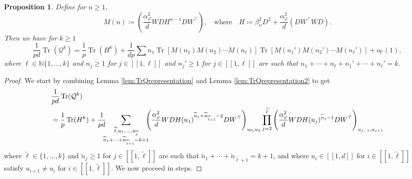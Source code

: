 \documentclass[letterpaper, 10pt, dvipsnames]{article}
\numberwithin{equation}{section}
\DeclareMathOperator{\Tr}{Tr}
\newcommand{\N}{\mathbb{N}}
\newcommand{\Q}{\mathcal{Q}}
\renewcommand{\phi}{\varphi}
\renewcommand{\tilde}{\widetilde}
\renewcommand{\P}{\mathds{P}}
\newcommand{\unn}[2]{[\![#1,#2]\!]}
\newtheorem{prop}[ccounter]{Proposition}
\theoremstyle{definition}
\begin{document}
\begin{prop}\label{prop:TrQk}
  Define for $n \geq 1$,
  \[
  M(n) \coloneqq \left(
    \frac{\alpha_\phi^2}{d} W D H^{n-1} DW^\top
  \right),
  \quad \text{where} \quad
  H \coloneqq \beta_\psi^2D^2 + \frac{\alpha_\phi^2}{d}\left( DW^\top WD\right).
  \]
  Then we have for $k \geq 1$
  \[
  \frac{1}{pd}\Tr(\Q^k) 
  =
  \frac{1}{p}\Tr(H^k)+
  \frac{1}{dp} \sum n_1 \Tr[ M(n_1)M(n_2)\cdots M(n_\ell)]\Tr[M(n_1')M(n_2')\cdots M(n_\ell')]
  +o_{\P}(1),
  \]
  where $\ell \in \N\{1,\dots,k\}$ and $n_j \geq 1$ for $j \in \unn{1}{\ell}$ and $n_j' \geq 1$ for $j \in \unn{1}{\ell}$ are such that $n_1+\cdots+n_\ell+ n_1'+\cdots+n_\ell'=k$.
\end{prop}
\begin{proof}
  We start by combining Lemma \ref{lem:TrQrepresentation} and Lemma \ref{lem:TrQrepresentation2} to get 
  \begin{equation}\label{eq:trqk-1}
  \begin{aligned}
    &\frac{1}{pd}\Tr(\Q^k) 
    \\&
    =\frac{1}{p}\Tr(H^k)+
    \frac{1}{pd}
    \hspace{-.6em}\sum_{\substack{\tilde{\ell}, u_1, \dots, u_{\tilde{\ell}} \\ \tilde{n}_1+\cdots+\tilde{n}_{\tilde{\ell}+1}=k+1}}\hspace{-.6em}
    \left(       \frac{\alpha_\phi^2}{d}
    W D H(u_1)^{\tilde{n}_1+\tilde{n}_{\tilde{\ell}+1}-2} DW^\top \right)_{u_0, u_2}
    \prod_{j=2}^{\tilde{\ell}}
    \left(       \frac{\alpha_\phi^2}{d}
    W D H(u_j)^{\tilde{n}_j-1} DW^\top \right)_{u_{j-1}, u_{j+1}}
  \end{aligned}
\end{equation}
  where $\tilde{\ell} \in \{1,\dots,k\}$ and $\tilde{n}_j \geq 1$ for $j \in \unn{1}{\tilde{\ell}}$ are such that $\tilde{n}_1+\cdots+\tilde{n}_{\tilde{\ell}+1}=k+1$, and where $u_i \in \unn{1}{d}$ for $i \in \unn{1}{\tilde{\ell}}$ satisfy $u_{i+1} \neq u_i$ for $i \in \unn{1}{\tilde{\ell}}$.
  We now proceed in steps.

\end{proof}
\end{document}
